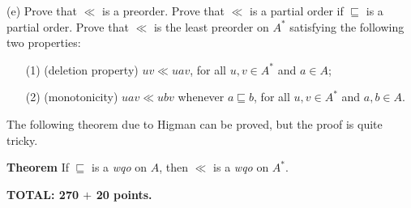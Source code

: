 \documentclass[12pt]{article}
\def\qleq{\sqsubseteq}
\begin{document}
\medskip
(e)
Prove that $\ll$ is a preorder. Prove that
$\ll$ is a partial order if $\qleq$ is a
partial order.
Prove  that $\ll$ is the least preorder on
$A^{*}$ satisfying the following two properties:

\begin{enumerate}
\item[(1)] (deletion property)
$uv \ll uav$, for all $u, v\in A^{*}$ and $a\in A$;
\medskip
\item[(2)] (monotonicity)
$uav\ll ubv$ whenever $a\qleq b$, for all $u, v\in A^{*}$ and $a, b\in A$.
\end{enumerate}

\remark
The following theorem due to  Higman can be proved, but the proof
is quite tricky.

\medskip\noindent
{\bf Theorem\/}
If $\qleq$ is a {\it wqo\/} on $A$, then $\ll$ is a {\it wqo\/} on
$A^{*}$.




\vspace{0.5cm}\noindent
{\bf TOTAL:   270 $+$ 20 points.}
\end{document}
